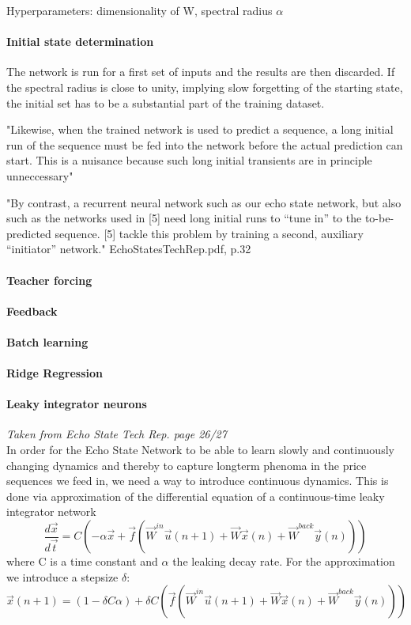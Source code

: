 Hyperparameters: dimensionality of W, spectral radius $\alpha$

\paragraph*{Initial state determination}
The network is run for a first set of inputs and the results are then discarded. If the spectral radius is close to unity, implying slow forgetting of the starting state, the initial set has to be a substantial part of the training dataset.

"Likewise, when the trained network is used to predict a sequence, a long initial run of the sequence must be fed into the network before the actual prediction can start. This is a nuisance because such long initial transients are in principle unneccessary"

"By contrast, a recurrent neural network such as our echo state network, but also such as the networks used in [5] need long initial runs to “tune in” to the to-be-predicted sequence. [5] tackle this problem by training a second, auxiliary “initiator” network."
EchoStatesTechRep.pdf, p.32

\paragraph*{Teacher forcing}

\paragraph*{Feedback}

\paragraph*{Batch learning}

\paragraph*{Ridge Regression}

\paragraph*{Leaky integrator neurons}
\emph{Taken from Echo State Tech Rep. page 26/27}\\
In order for the Echo State Network to be able to learn slowly and continuously changing dynamics and thereby to capture longterm phenoma in the price sequences we feed in, we need a way to introduce continuous dynamics. This is done via approximation of the differential equation of a continuous-time leaky integrator network
\begin{equation}
    \frac{d\vec{x}}{d\vec{t}} = C (-\alpha\vec{x} + \vec{f}(\vec{W}^{in}\vec{u}(n+1)+\vec{W}\vec{x}(n)+\vec{W}^{back}\vec{y}(n)))
\end{equation}
where C is a time constant and $\alpha$ the leaking decay rate. For the approximation we introduce a stepsize $\delta$:
\[
    \vec{x}(n+1)=(1-\delta C \alpha) + \delta C (\vec{f}(\vec{W}^{in}\vec{u}(n+1)+\vec{W}\vec{x}(n)+\vec{W}^{back}\vec{y}(n)))
\]

